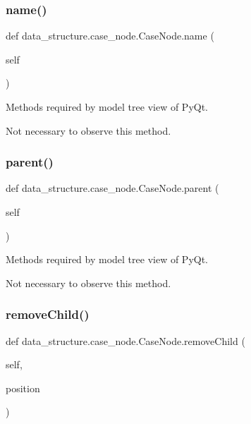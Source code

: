 \subsubsection{\texorpdfstring{name()}{name()}}
{\footnotesize\ttfamily def data\+\_\+structure.\+case\+\_\+node.\+Case\+Node.\+name (\begin{DoxyParamCaption}\item[{}]{self }\end{DoxyParamCaption})}



Methods required by model tree view of Py\+Qt. 

Not necessary to observe this method. \hypertarget{classdata__structure_1_1case__node_1_1_case_node_a130f184f648103908a74a8a332f7513f}{}\label{classdata__structure_1_1case__node_1_1_case_node_a130f184f648103908a74a8a332f7513f} 
\subsubsection{\texorpdfstring{parent()}{parent()}}
{\footnotesize\ttfamily def data\+\_\+structure.\+case\+\_\+node.\+Case\+Node.\+parent (\begin{DoxyParamCaption}\item[{}]{self }\end{DoxyParamCaption})}



Methods required by model tree view of Py\+Qt. 

Not necessary to observe this method. \hypertarget{classdata__structure_1_1case__node_1_1_case_node_ac40fac97e12433646432658373d17bb5}{}\label{classdata__structure_1_1case__node_1_1_case_node_ac40fac97e12433646432658373d17bb5} 
\subsubsection{\texorpdfstring{remove\+Child()}{removeChild()}}
{\footnotesize\ttfamily def data\+\_\+structure.\+case\+\_\+node.\+Case\+Node.\+remove\+Child (\begin{DoxyParamCaption}\item[{}]{self,  }\item[{}]{position }\end{DoxyParamCaption})}




